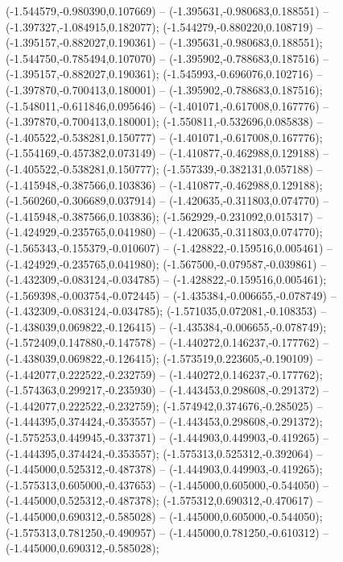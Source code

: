  (-1.544579,-0.980390,0.107669) -- (-1.395631,-0.980683,0.188551) -- (-1.397327,-1.084915,0.182077);
 (-1.544279,-0.880220,0.108719) -- (-1.395157,-0.882027,0.190361) -- (-1.395631,-0.980683,0.188551);
 (-1.544750,-0.785494,0.107070) -- (-1.395902,-0.788683,0.187516) -- (-1.395157,-0.882027,0.190361);
 (-1.545993,-0.696076,0.102716) -- (-1.397870,-0.700413,0.180001) -- (-1.395902,-0.788683,0.187516);
 (-1.548011,-0.611846,0.095646) -- (-1.401071,-0.617008,0.167776) -- (-1.397870,-0.700413,0.180001);
 (-1.550811,-0.532696,0.085838) -- (-1.405522,-0.538281,0.150777) -- (-1.401071,-0.617008,0.167776);
 (-1.554169,-0.457382,0.073149) -- (-1.410877,-0.462988,0.129188) -- (-1.405522,-0.538281,0.150777);
 (-1.557339,-0.382131,0.057188) -- (-1.415948,-0.387566,0.103836) -- (-1.410877,-0.462988,0.129188);
 (-1.560260,-0.306689,0.037914) -- (-1.420635,-0.311803,0.074770) -- (-1.415948,-0.387566,0.103836);
 (-1.562929,-0.231092,0.015317) -- (-1.424929,-0.235765,0.041980) -- (-1.420635,-0.311803,0.074770);
 (-1.565343,-0.155379,-0.010607) -- (-1.428822,-0.159516,0.005461) -- (-1.424929,-0.235765,0.041980);
 (-1.567500,-0.079587,-0.039861) -- (-1.432309,-0.083124,-0.034785) -- (-1.428822,-0.159516,0.005461);
 (-1.569398,-0.003754,-0.072445) -- (-1.435384,-0.006655,-0.078749) -- (-1.432309,-0.083124,-0.034785);
 (-1.571035,0.072081,-0.108353) -- (-1.438039,0.069822,-0.126415) -- (-1.435384,-0.006655,-0.078749);
 (-1.572409,0.147880,-0.147578) -- (-1.440272,0.146237,-0.177762) -- (-1.438039,0.069822,-0.126415);
 (-1.573519,0.223605,-0.190109) -- (-1.442077,0.222522,-0.232759) -- (-1.440272,0.146237,-0.177762);
 (-1.574363,0.299217,-0.235930) -- (-1.443453,0.298608,-0.291372) -- (-1.442077,0.222522,-0.232759);
 (-1.574942,0.374676,-0.285025) -- (-1.444395,0.374424,-0.353557) -- (-1.443453,0.298608,-0.291372);
 (-1.575253,0.449945,-0.337371) -- (-1.444903,0.449903,-0.419265) -- (-1.444395,0.374424,-0.353557);
 (-1.575313,0.525312,-0.392064) -- (-1.445000,0.525312,-0.487378) -- (-1.444903,0.449903,-0.419265);
 (-1.575313,0.605000,-0.437653) -- (-1.445000,0.605000,-0.544050) -- (-1.445000,0.525312,-0.487378);
 (-1.575312,0.690312,-0.470617) -- (-1.445000,0.690312,-0.585028) -- (-1.445000,0.605000,-0.544050);
 (-1.575313,0.781250,-0.490957) -- (-1.445000,0.781250,-0.610312) -- (-1.445000,0.690312,-0.585028);
